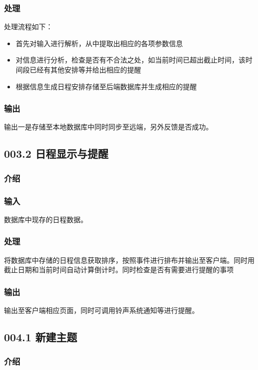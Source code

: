     \subsubsection{处理}
    处理流程如下：
    \begin{itemize}
      \item 首先对输入进行解析，从中提取出相应的各项参数信息
      \item 对信息进行分析，检查是否有不合法之处，如当前时间已超出截止时间，该时间段已经有其他安排等并给出相应的提醒
      \item 根据信息生成日程安排存储至后端数据库并生成相应的提醒
    \end{itemize}
    \subsubsection{输出}
    输出一是存储至本地数据库中同时同步至远端，另外反馈是否成功。

  \subsection{003.2 日程显示与提醒}
    \subsubsection{介绍}

    \subsubsection{输入}
    数据库中现存的日程数据。
    \subsubsection{处理}
    将数据库中存储的日程信息获取排序，按照事件进行排布并输出至客户端。同时用截止日期和当前时间自动计算倒计时。同时检查是否有需要进行提醒的事项
    \subsubsection{输出}
    输出至客户端相应页面，同时可调用铃声系统通知等进行提醒。

  \subsection{004.1 新建主题}
    \subsubsection{介绍}

